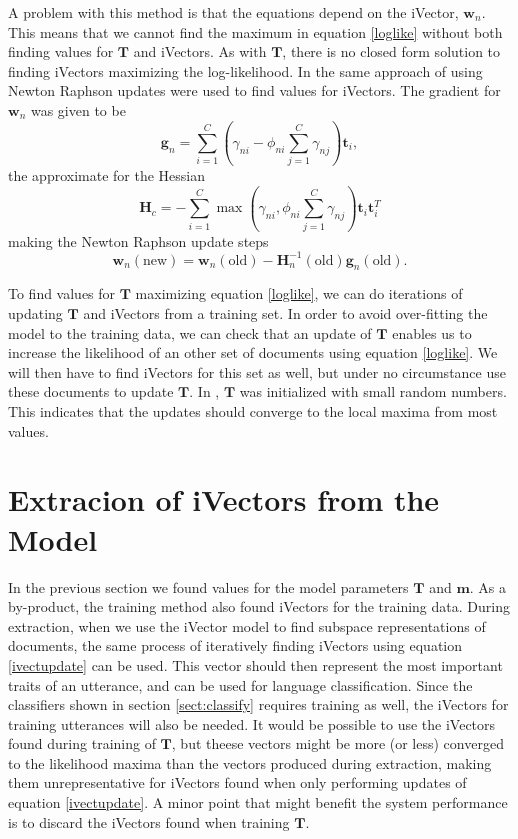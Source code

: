 A problem with this method is that the equations depend on the iVector, $\mathbf{w}_n$. This means that we cannot find the maximum in equation \ref{loglike} without both finding values for $\mathbf{T}$ and iVectors. As with $\mathbf{T}$, there is no closed form solution to finding iVectors maximizing the log-likelihood. In \cite{srivector} the same approach of using Newton Raphson updates were used to find values for iVectors. The gradient for $\mathbf{w}_n$ was given to be
\begin{equation}
\label{ivectgrad}
\mathbf{g}_n = \sum_{i=1}^C \left(\gamma_{ni}-\phi_{ni}\sum_{j=1}^C \gamma_{nj}\right)\mathbf{t}_i,
\end{equation}
the approximate for the Hessian
\begin{equation}
\label{ivecthessian}
\mathbf{H}_c = -\sum_{i=1}^C \max\left(\gamma_{ni}, \phi_{ni}\sum_{j=1}^C \gamma_{nj}\right)\mathbf{t}_i \mathbf{t}_i^T
\end{equation}
making the Newton Raphson update steps
\begin{equation}
\label{ivectupdate}
\mathbf{w}_n(\text{new}) = \mathbf{w}_n(\text{old})-\mathbf{H}_n^{-1}(\text{old})\mathbf{g}_n(\text{old}).
\end{equation}

To find values for $\mathbf{T}$ maximizing equation \ref{loglike}, we can do iterations of updating $\mathbf{T}$ and iVectors from a training set. In order to avoid over-fitting the model to the training data, we can check that an update of $\mathbf{T}$ enables us to increase the likelihood of an other set of documents using equation \ref{loglike}. We will then have to find iVectors for this set as well, but under no circumstance use these documents to update $\mathbf{T}$. In \cite{lrivector}, $\mathbf{T}$ was initialized with small random numbers. This indicates that the updates should converge to the local maxima from most values. 

\section{Extracion of iVectors from the Model}
\label{sect:ivectextract}

In the previous section we found values for the model parameters $\mathbf{T}$ and $\mathbf{m}$. As a by-product, the training method also found iVectors for the training data. During extraction, when we use the iVector model to find subspace representations of documents, the same process of iteratively finding iVectors using equation \ref{ivectupdate} can be used. This vector should then represent the most important traits of an utterance, and can be used for language classification. Since the classifiers shown in section \ref{sect:classify} requires training as well, the iVectors for training utterances will also be needed. It would be possible to use the iVectors found during training of $\mathbf{T}$, but theese vectors might be more (or less) converged to the likelihood maxima than the vectors produced during extraction, making them unrepresentative for iVectors found when only performing updates of equation \ref{ivectupdate}.  A minor point that might benefit the system performance is to discard the iVectors found when training $\mathbf{T}$.

